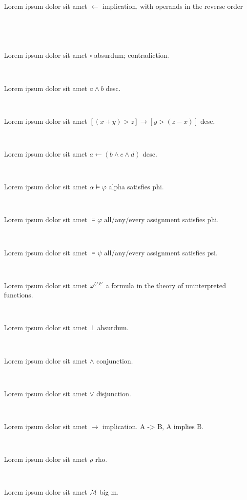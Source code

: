 \documentclass[12pt]{article}
\begin{document}
\centerline{~}

Lorem ipsum dolor sit amet $ \leftarrow  $ implication, with operands in the reverse order

\centerline{~}

\centerline{~}

Lorem ipsum dolor sit amet $ \square $ absurdum; contradiction.

\centerline{~}


Lorem ipsum dolor sit amet $ a \wedge b $ desc.

\centerline{~}


Lorem ipsum dolor sit amet $ [ ( x + y ) > z ] \rightarrow [ y > ( z - x ) ] $ desc.

\centerline{~}


Lorem ipsum dolor sit amet $ a \leftarrow ( b \wedge c \wedge d )  $ desc.

\centerline{~}

Lorem ipsum dolor sit amet $ \alpha \vDash \varphi $ alpha satisfies phi.

\centerline{~}

Lorem ipsum dolor sit amet $ \vDash \varphi $ all/any/every assignment satisfies phi.

\centerline{~}

Lorem ipsum dolor sit amet $ \vDash \psi $ all/any/every assignment satisfies psi.

\centerline{~}

Lorem ipsum dolor sit amet $ \varphi^{\scriptsize UF} $ a formula in the theory of uninterpreted functions.

\centerline{~}

Lorem ipsum dolor sit amet $ \bot $ absurdum.

\centerline{~}

Lorem ipsum dolor sit amet $ \wedge $ conjunction.

\centerline{~}

Lorem ipsum dolor sit amet $ \vee $ disjunction.

\centerline{~}

Lorem ipsum dolor sit amet $ \rightarrow $ implication.  A -> B,  A implies B.

\centerline{~}

Lorem ipsum dolor sit amet $ \rho $ rho.

\centerline{~}

Lorem ipsum dolor sit amet $ \mathcal{M} $ big m.

\centerline{~}
\end{document}
